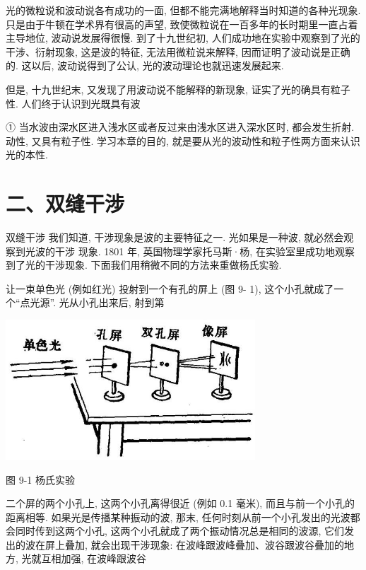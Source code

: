 \documentclass[10pt]{article}
\begin{document}
光的微粒说和波动说各有成功的一面, 但都不能完满地解释当时知道的各种光现象. 只是由于牛顿在学术界有很高的声望, 致使微粒说在一百多年的长时期里一直占着主导地位, 波动说发展得很慢. 到了十九世纪初, 人们成功地在实验中观察到了光的干涉、衍射现象, 这是波的特征, 无法用微粒说来解释, 因而证明了波动说是正确的. 这以后, 波动说得到了公认, 光的波动理论也就迅速发展起来.

但是, 十九世纪末, 又发现了用波动说不能解释的新现象, 证实了光的确具有粒子性. 人们终于认识到光既具有波

① 当水波由深水区进入浅水区或者反过来由浅水区进入深水区时, 都会发生折射. 动性, 又具有粒子性. 学习本章的目的, 就是要从光的波动性和粒子性两方面来认识光的本性.

\section*{二、双缝干涉}

双缝干涉 我们知道, 干涉现象是波的主要特征之一. 光如果是一种波, 就必然会观察到光波的干涉 现象. 1801 年, 英国物理学家托马斯·杨, 在实验室里成功地观察到了光的干涉现象. 下面我们用稍微不同的方法来重做杨氏实验.

让一束单色光 (例如红光) 投射到一个有孔的屏上 (图 9- 1), 这个小孔就成了一个“点光源”. 光从小孔出来后, 射到第

\begin{center}
\includegraphics[max width=0.7\textwidth]{images/01913056-1f15-74d8-9184-9aab52c9d66b_299_951784.jpg}
\end{center}

图 9-1 杨氏实验

二个屏的两个小孔上, 这两个小孔离得很近 (例如 0.1 毫米), 而且与前一个小孔的距离相等. 如果光是传播某种振动的波, 那末, 任何时刻从前一个小孔发出的光波都会同时传到这两个小孔, 这两个小孔就成了两个振动情况总是相同的波源, 它们发出的波在屏上叠加, 就会出现干涉现象: 在波峰跟波峰叠加、波谷跟波谷叠加的地方, 光就互相加强, 在波峰跟波谷
\end{document}
